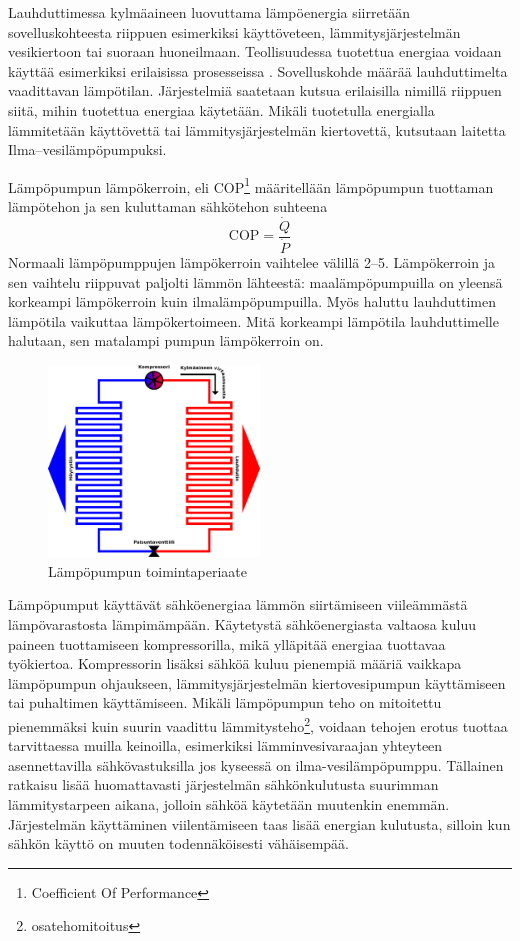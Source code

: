   Lauhduttimessa kylmäaineen luovuttama lämpöenergia siirretään sovelluskohteesta riippuen esimerkiksi käyttöveteen, lämmitysjärjestelmän vesikiertoon tai suoraan huoneilmaan. Teollisuudessa tuotettua energiaa voidaan käyttää esimerkiksi erilaisissa prosesseissa \parencite{Setala}. Sovelluskohde määrää lauhduttimelta vaadittavan lämpötilan. Järjestelmiä saatetaan kutsua erilaisilla nimillä riippuen siitä, mihin tuotettua energiaa käytetään. Mikäli tuotetulla energialla lämmitetään käyttövettä tai lämmitysjärjestelmän kiertovettä, kutsutaan laitetta Ilma--vesilämpöpumpuksi. \parencite{sulpu}

  Lämpöpumpun lämpökerroin, eli COP\footnote{Coefficient Of Performance} määritellään lämpöpumpun tuottaman lämpötehon ja sen kuluttaman sähkötehon suhteena
  \begin{equation}
      \textrm{COP} = \frac{\dot{Q}}{\dot{P}}
  \end{equation}
  Normaali lämpöpumppujen lämpökerroin vaihtelee välillä 2--5. Lämpökerroin ja sen vaihtelu riippuvat paljolti lämmön lähteestä: maalämpöpumpuilla on yleensä korkeampi lämpökerroin kuin ilmalämpöpumpuilla. \parencite{DincerRosen} Myös haluttu lauhduttimen lämpötila vaikuttaa lämpökertoimeen. Mitä korkeampi lämpötila lauhduttimelle halutaan, sen matalampi pumpun lämpökerroin on. \parencite[kuva 7.6]{DincerRosen}

  \begin{figure}
    \centering
    \includegraphics[width=0.5\textwidth]{figures/hp}
    \caption{Lämpöpumpun toimintaperiaate}
    \label{fig:hptp}
  \end{figure}

  Lämpöpumput käyttävät sähköenergiaa lämmön siirtämiseen viileämmästä lämpövarastosta lämpimämpään. Käytetystä sähköenergiasta valtaosa kuluu paineen tuottamiseen kompressorilla, mikä ylläpitää energiaa tuottavaa työkiertoa. Kompressorin lisäksi sähköä kuluu pienempiä määriä vaikkapa lämpöpumpun ohjaukseen, lämmitysjärjestelmän kiertovesipumpun käyttämiseen tai puhaltimen käyttämiseen. Mikäli lämpöpumpun teho on mitoitettu pienemmäksi kuin suurin vaadittu lämmitysteho\footnote{osatehomitoitus}, voidaan tehojen erotus tuottaa tarvittaessa muilla keinoilla, esimerkiksi lämminvesivaraajan yhteyteen asennettavilla sähkövastuksilla jos kyseessä on ilma-vesilämpöpumppu. Tällainen ratkaisu lisää huomattavasti järjestelmän sähkönkulutusta suurimman lämmitystarpeen aikana, jolloin sähköä käytetään muutenkin enemmän. Järjestelmän käyttäminen viilentämiseen taas lisää energian kulutusta, silloin kun sähkön käyttö on muuten todennäköisesti vähäisempää.

